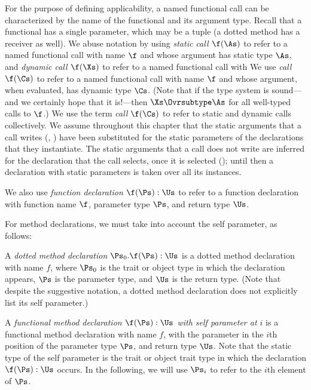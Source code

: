 For the purpose of defining applicability, a named functional call can
be characterized by the name of the functional and its argument type.
Recall that a functional has a single parameter, which may be a tuple
(a dotted method has a receiver as well).
 We abuse notation by using
\emph{static call $\f(\As)$} to refer to a named functional call with
name $\f$ and whose argument has static type $\As$, and
\emph{dynamic call $\f(\Xs)$} to refer to a named functional call with
We use \emph{call $\f(\Cs)$} to refer to a named functional call with
name $\f$ and whose argument, when evaluated, has dynamic type $\Cs$.
(Note that if the type system is sound---and we certainly hope that
it is!---then $\Xs \Ovrsubtype \As$ for all well-typed calls to $\f$.)
We use the term \emph{call $\f(\Cs)$} to refer to static and dynamic calls
collectively.
We assume throughout this chapter that the static arguments that a call writes
(, ) have been substituted for the
static parameters of the declarations that they instantiate.
The static arguments that a call does not write are inferred for the
declaration that the call selects, once it is selected
(); until then a declaration with static parameters is
taken over all its instances.


We also use \emph{function declaration $\f(\Ps):\Us$} to refer to a
function declaration with function name $\f$, parameter type $\Ps$,
and return type $\Us$.


For method declarations, we must take into account the self parameter,
as follows:

A \emph{dotted method declaration $\Ps_0.\f(\Ps):\Us$} is a dotted
method declaration with name $f$, where $\Ps_0$ is the trait or object
type in which the declaration appears, $\Ps$ is the parameter type,
and $\Us$ is the return type.  (Note that despite the suggestive
notation, a dotted method declaration does not explicitly list its
self parameter.)

A \emph{functional method declaration $\f(\Ps):\Us$ with self
parameter at $i$} is a functional method declaration with name $f$,
with the parameter  in the $i$th position
of the parameter type $\Ps$, and return type $\Us$.  Note that the static
type of the self parameter is the trait or object trait type in which
the declaration $\f(\Ps):\Us$ occurs.  In the following, we will use
$\Ps_i$ to refer to the $i$th element of $\Ps$.

